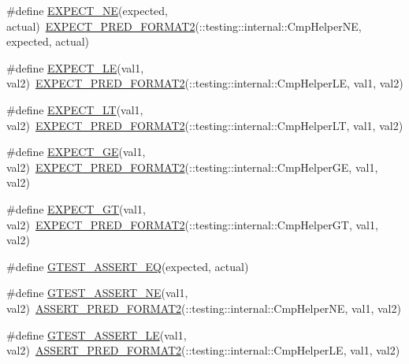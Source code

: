 \begin{DoxyCompactItemize}
\item 
\#define \hyperlink{fused-src_2gtest_2gtest_8h_adb8a724f2c5c63ead11073c21fd51198}{E\-X\-P\-E\-C\-T\-\_\-\-N\-E}(expected, actual)~\hyperlink{gtest__pred__impl_8h_af0141918615a5e2d5247e9cda8324dae}{E\-X\-P\-E\-C\-T\-\_\-\-P\-R\-E\-D\-\_\-\-F\-O\-R\-M\-A\-T2}(\-::testing\-::internal\-::\-Cmp\-Helper\-N\-E, expected, actual)
\item 
\#define \hyperlink{fused-src_2gtest_2gtest_8h_ae0f265632323b4a07b585dcfde10f60a}{E\-X\-P\-E\-C\-T\-\_\-\-L\-E}(val1, val2)~\hyperlink{gtest__pred__impl_8h_af0141918615a5e2d5247e9cda8324dae}{E\-X\-P\-E\-C\-T\-\_\-\-P\-R\-E\-D\-\_\-\-F\-O\-R\-M\-A\-T2}(\-::testing\-::internal\-::\-Cmp\-Helper\-L\-E, val1, val2)
\item 
\#define \hyperlink{fused-src_2gtest_2gtest_8h_af28c06b2b5e8dee151896f299f6610cf}{E\-X\-P\-E\-C\-T\-\_\-\-L\-T}(val1, val2)~\hyperlink{gtest__pred__impl_8h_af0141918615a5e2d5247e9cda8324dae}{E\-X\-P\-E\-C\-T\-\_\-\-P\-R\-E\-D\-\_\-\-F\-O\-R\-M\-A\-T2}(\-::testing\-::internal\-::\-Cmp\-Helper\-L\-T, val1, val2)
\item 
\#define \hyperlink{fused-src_2gtest_2gtest_8h_ab7a0ff4bfa4d9b27baa118d8b0756ca0}{E\-X\-P\-E\-C\-T\-\_\-\-G\-E}(val1, val2)~\hyperlink{gtest__pred__impl_8h_af0141918615a5e2d5247e9cda8324dae}{E\-X\-P\-E\-C\-T\-\_\-\-P\-R\-E\-D\-\_\-\-F\-O\-R\-M\-A\-T2}(\-::testing\-::internal\-::\-Cmp\-Helper\-G\-E, val1, val2)
\item 
\#define \hyperlink{fused-src_2gtest_2gtest_8h_aa8bc8320813e1abb0016129b636e3b27}{E\-X\-P\-E\-C\-T\-\_\-\-G\-T}(val1, val2)~\hyperlink{gtest__pred__impl_8h_af0141918615a5e2d5247e9cda8324dae}{E\-X\-P\-E\-C\-T\-\_\-\-P\-R\-E\-D\-\_\-\-F\-O\-R\-M\-A\-T2}(\-::testing\-::internal\-::\-Cmp\-Helper\-G\-T, val1, val2)
\item 
\#define \hyperlink{fused-src_2gtest_2gtest_8h_ab49d537c37c637256307f8d55154050c}{G\-T\-E\-S\-T\-\_\-\-A\-S\-S\-E\-R\-T\-\_\-\-E\-Q}(expected, actual)
\item 
\#define \hyperlink{fused-src_2gtest_2gtest_8h_a6fa9bb2b6731eba8f481e40e9e4931b3}{G\-T\-E\-S\-T\-\_\-\-A\-S\-S\-E\-R\-T\-\_\-\-N\-E}(val1, val2)~\hyperlink{gtest__pred__impl_8h_ac452685a1a98ea3d96eb956a062ee210}{A\-S\-S\-E\-R\-T\-\_\-\-P\-R\-E\-D\-\_\-\-F\-O\-R\-M\-A\-T2}(\-::testing\-::internal\-::\-Cmp\-Helper\-N\-E, val1, val2)
\item 
\#define \hyperlink{fused-src_2gtest_2gtest_8h_abef04dcd4a0259d378de7b3b3ffb6730}{G\-T\-E\-S\-T\-\_\-\-A\-S\-S\-E\-R\-T\-\_\-\-L\-E}(val1, val2)~\hyperlink{gtest__pred__impl_8h_ac452685a1a98ea3d96eb956a062ee210}{A\-S\-S\-E\-R\-T\-\_\-\-P\-R\-E\-D\-\_\-\-F\-O\-R\-M\-A\-T2}(\-::testing\-::internal\-::\-Cmp\-Helper\-L\-E, val1, val2)

\end{DoxyCompactItemize}
